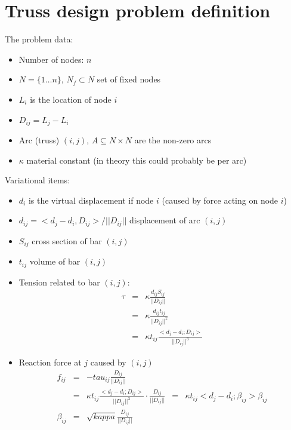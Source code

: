 \documentclass{article}
\begin{document}
\section{Truss design problem definition}

The problem data:
\begin{itemize}
\item Number of nodes: $n$
\item $N = \{ 1\ldots n\}$, $N_f\subset N$ set of fixed nodes
\item $L_i$ is the location of node $i$
\item $D_{ij} = L_j-L_i$
\item Arc (truss) $(i,j)$, $A\subseteq N\times N$ are the non-zero arcs
\item $\kappa$ material constant (in theory this could probably be per arc)
\end{itemize}

Variational items:
\begin{itemize}
\item $d_i$ is the virtual displacement if node $i$ (caused by force acting on node $i$)
\item $d_{ij}=<d_j-d_i,D_{ij}>/||D_{ij}||$ displacement of arc $(i,j)$ 
\item $S_{ij}$ cross section of bar $(i,j)$
\item $t_{ij}$ volume of bar $(i,j)$
\item Tension related to bar $(i,j)$:
\begin{eqnarray*}
    \tau 
    & = & \kappa \frac{d_{ij} S_{ij}}{||D_{ij}||} \\
    & = & \kappa \frac{d_{ij} t_{ij}}{||D_{ij}||^2} \\
    & = & \kappa t_{ij} \frac{<d_j-d_i; D_{ij}>}{||D_{ij}||^3}
\end{eqnarray*}
\item Reaction force at $j$ caused by $(i,j)$
\begin{eqnarray*}
    f_{ij}
    & = & -tau_{ij} \frac{D_{ij}}{||D_{ij}||} \\
    & = & \kappa t_{ij} \frac{<d_j-d_i; D_{ij}>}{||D_{ij}||^3}\cdot \frac{D_{ij}}{||D_{ij}||} 
    & = & \kappa t_{ij} <d_j-d_i; \beta_{ij}>\beta_{ij} \\
    \beta_{ij} & = & \sqrt{kappa}\frac{D_{ij}}{||D_{ij}||}
\end{eqnarray*}

\end{itemize}
\end{document}
